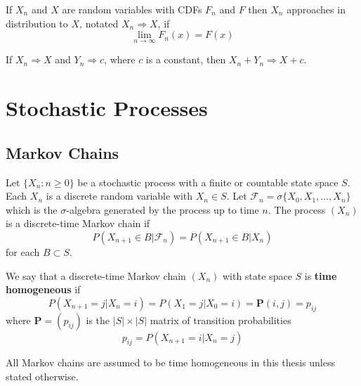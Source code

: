 \begin{defn}
If $X_n$ and $X$ are random variables with CDFs $F_n$ and $F$ then $X_n$ approaches in distribution to $X$, notated $X_n \Rightarrow X$, if
$$
\lim_{n \to \infty} F_n(x) = F(x)
$$
\end{defn}


\begin{theorem} \label{thm:conv_together_lemma}
If $X_n \Rightarrow X$ and $Y_n \Rightarrow c$, where $c$ is a constant, then $X_n + Y_n \Rightarrow X + c$.
\end{theorem}

\section{Stochastic Processes}

\subsection{Markov Chains}

\begin{defn} \cite{schapira2017}
Let $\{X_n : n \geq 0\}$ be a stochastic process with a finite or countable state space $S$.
Each $X_n$ is a discrete random variable with $X_n \in S$.
Let $\mathscr{F}_n = \sigma\{X_0, X_1, \ldots, X_n\}$ which is the $\sigma$-algebra generated by the process up to time $n$.
The process $(X_n)$ is a discrete-time Markov chain if
$$
P(X_{n + 1} \in B | \mathscr{F}_n) = P(X_{n + 1} \in B | X_n)
$$
for each $B \subset S$.
\end{defn}

\begin{defn}\cite{grimmett2001}
We say that a discrete-time Markov chain $(X_n)$ with state space $S$ is \textbf{time homogeneous} if
$$
P(X_{n + 1} = j | X_n = i) = P(X_{1} = j | X_0 = i) = \mathbf{P}(i,j) = p_{ij}
$$
where $\mathbf{P} = (p_{ij})$ is the $|S| \times |S|$ matrix of transition probabilities
$$
p_{ij} = P(X_{n + 1} = i | X_n = j)
$$

All Markov chains are assumed to be time homogeneous in this thesis unless stated otherwise.
\end{defn}

